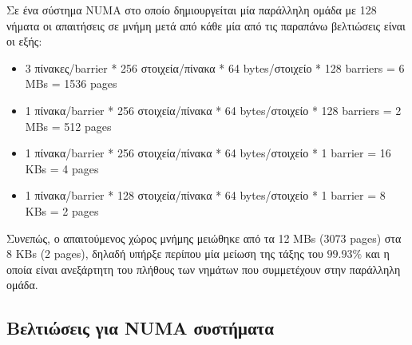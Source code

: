 Σε ένα σύστημα NUMA στο οποίο δημιουργείται μία παράλληλη ομάδα με 128 νήματα οι απαιτήσεις σε μνήμη μετά από κάθε μία από τις παραπάνω βελτιώσεις είναι οι εξής:
\begin{itemize}
	\item 3 πίνακες/barrier * 256 στοιχεία/πίνακα * 64 bytes/στοιχείο * 128 barriers \newline = 6 MBs = 1536 pages
	\item 1 πίνακα/barrier * 256 στοιχεία/πίνακα * 64 bytes/στοιχείο * 128 barriers \newline = 2 MBs = 512 pages
	\item 1 πίνακα/barrier * 256 στοιχεία/πίνακα * 64 bytes/στοιχείο * 1 barrier \newline = 16 KBs = 4 pages
	\item 1 πίνακα/barrier * 128 στοιχεία/πίνακα * 64 bytes/στοιχείο * 1 barrier \newline = 8 KBs = 2 pages
\end{itemize}

Συνεπώς, ο απαιτούμενος χώρος μνήμης μειώθηκε από τα 12 MBs (3073 pages) στα 8 KBs (2 pages), δηλαδή υπήρξε περίπου μία μείωση της τάξης του $99.93\%$ και η οποία είναι ανεξάρτητη του πλήθους των νημάτων που συμμετέχουν στην παράλληλη ομάδα.


\subsection{Βελτιώσεις για NUMA συστήματα}
